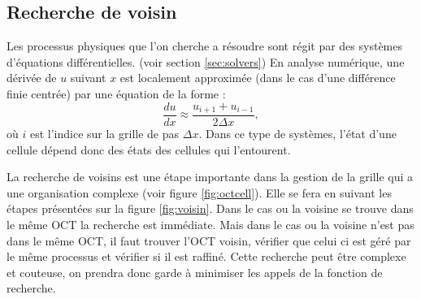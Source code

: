 

\subsection{Recherche de voisin}
\label{sec:voisins}

Les processus physiques que l'on cherche a résoudre sont régit par des systèmes d'équations différentielles. (voir section \ref{sec:solvers})
En analyse numérique, une dérivée de $u$ suivant $x$ est localement approximée (dans le cas d'une différence finie centrée) par une équation de la forme :
\begin{equation}
\frac{d u}{dx} \approx \frac{u_{i+1}  + u_{i-1}}{2\Delta x}, 
\end{equation}
où $i$ est l'indice sur la grille de pas $\Delta x$.
Dans ce type de systèmes, l'état d'une cellule dépend donc des états des cellules qui l'entourent.


La recherche de voisins est une étape importante dans la gestion de la grille qui a une organisation complexe (voir figure \ref{fig:octcell}).
Elle se fera en suivant les étapes présentées sur la figure \ref{fig:voisin}.
Dans le cas ou la voisine se trouve dans le même OCT la recherche est immédiate.
Mais dans le cas ou la voisine n'est pas dans le même OCT, il faut trouver l'OCT voisin, vérifier que celui ci est géré par le même processus et vérifier si il est raffiné.
Cette recherche peut être complexe et couteuse, on prendra donc garde à minimiser les appels de la fonction de recherche. 

